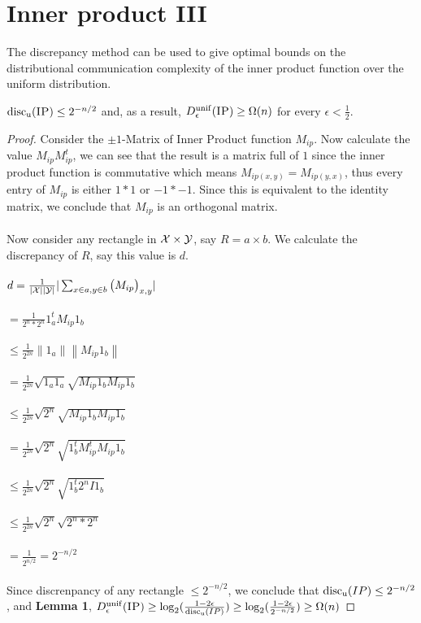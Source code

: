 \section{Inner product III}

The discrepancy method can be used to give optimal bounds on the distributional communication complexity of the inner product function over the uniform distribution.

\begin{theorem}
	$\mathrm{disc_u}(\textsc{IP}) \le 2^{-n/2}$ and, as a result, $D_\epsilon^{\mathrm{unif}}(\textsc{IP}) \ge \Omega(n)$ for every $\epsilon < \frac12$.
\end{theorem}

\begin{proof}
	Consider the $\pm1$-Matrix of Inner Product function $M_{ip}$. Now calculate the value $M_{ip}M_{ip}^t$, we can see that the result is a matrix full of $1$ since the inner product function is commutative which means $M_{ip(x,y)} = M_{ip(y,x)}$, thus every entry of $M_{ip}$ is either $1*1$ or $-1*-1$. Since this is equivalent to the identity matrix, we conclude that $M_{ip}$ is an orthogonal matrix. \\
	\\
	Now consider any rectangle in $\mathcal{X} \times \mathcal{Y}$, say $R = a \times b$. We calculate the discrepancy of $R$, say this value is $d$. \\
	\\
	$d = \frac{1}{|\mathcal{X}||\mathcal{Y}|}|\sum_{x \in a,y \in b} \big(M_{ip}\big)_{x,y}|$ \\
	\\
	$= \frac{1}{2^n*2^n}1_a^tM_{ip}1_b$\\
	\\
	$\leq \frac{1}{2^{2n}}\left\lVert 1_a\right\rVert \left\lVert M_{ip}1_b\right\rVert$\\
	\\
	$= \frac{1}{2^{2n}}\sqrt{1_a1_a}\sqrt{M_{ip}1_bM_{ip}1_b}$\\
	\\
	$\leq \frac{1}{2^{2n}}\sqrt{2^n}\sqrt{M_{ip}1_bM_{ip}1_b}$ \\
	\\
	$= \frac{1}{2^{2n}}\sqrt{2^n}\sqrt{1_b^tM_{ip}^tM_{ip}1_b}$ \\
	\\
	$\leq \frac{1}{2^{2n}}\sqrt{2^n}\sqrt{1_b^t2^nI1_b}$\\ 
	\\
	$\leq \frac{1}{2^{2n}}\sqrt{2^n}\sqrt{2^n*2^n}$\\
	\\
	$= \frac{1}{2^{n/2}} = 2^{-n/2}$\\
	\\
	Since discrenpancy of any rectangle $\leq 2^{-n/2}$, we conclude that $\mathrm{disc_u}(IP) \leq 2^{-n/2}$, and \textbf{Lemma 1}, $D_\epsilon^{\mathrm{unif}}(\textsc{IP}) \ge \log_2(\frac{1-2\epsilon}{\mathrm{disc_u}(IP)}) \ge \log_2(\frac{1-2\epsilon}{2^{-n/2}}) \ge \Omega(n)$
\end{proof} 


